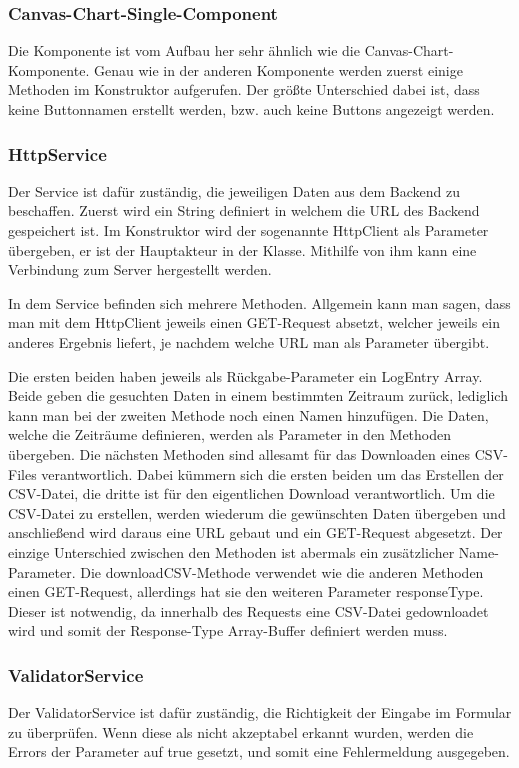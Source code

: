 \subsubsection{Canvas-Chart-Single-Component}
Die Komponente ist vom Aufbau her sehr ähnlich wie die Canvas-Chart-Komponente. Genau wie in der anderen Komponente werden zuerst einige Methoden im Konstruktor aufgerufen. Der größte Unterschied dabei ist, dass keine Buttonnamen erstellt werden, bzw. auch keine Buttons angezeigt werden. 

\subsubsection{HttpService}
Der Service ist dafür zuständig, die jeweiligen Daten aus dem Backend zu beschaffen. Zuerst wird ein String definiert in welchem die URL des Backend gespeichert ist. Im Konstruktor wird der sogenannte HttpClient als Parameter übergeben, er ist der Hauptakteur in der Klasse. Mithilfe von ihm kann eine Verbindung zum Server hergestellt werden. 

In dem Service befinden sich mehrere Methoden. Allgemein kann man sagen, dass man mit dem HttpClient jeweils einen GET-Request absetzt, welcher jeweils ein anderes Ergebnis liefert, je nachdem welche URL man als Parameter übergibt.

Die ersten beiden haben jeweils als Rückgabe-Parameter ein LogEntry Array. Beide geben die gesuchten Daten in einem bestimmten Zeitraum zurück, lediglich kann man bei der zweiten Methode noch einen Namen hinzufügen. Die Daten, welche die Zeiträume definieren, werden als Parameter in den Methoden übergeben. Die nächsten Methoden sind allesamt für das Downloaden eines CSV-Files verantwortlich. Dabei kümmern sich die ersten beiden um das Erstellen der CSV-Datei, die dritte ist für den eigentlichen Download verantwortlich. Um die CSV-Datei zu erstellen, werden wiederum die gewünschten Daten übergeben und anschließend wird daraus eine URL gebaut und ein GET-Request abgesetzt. Der einzige Unterschied zwischen den Methoden ist abermals ein zusätzlicher Name-Parameter. Die downloadCSV-Methode verwendet wie die anderen Methoden einen GET-Request, allerdings hat sie den weiteren Parameter responseType. Dieser ist notwendig, da innerhalb des Requests eine CSV-Datei gedownloadet wird und somit der Response-Type Array-Buffer definiert werden muss. 

\subsubsection{ValidatorService}
Der ValidatorService ist dafür zuständig, die Richtigkeit der Eingabe im Formular zu überprüfen. Wenn diese als nicht akzeptabel erkannt wurden, werden die Errors der Parameter auf true gesetzt, und somit eine Fehlermeldung ausgegeben.

